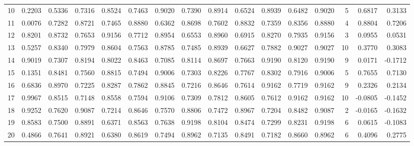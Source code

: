 \begin{tabular}{lrrrrrrrrrrrrrrr}
10  &      0.2203 &  0.5336 &  0.7316 &  0.8524 &  0.7463 &  0.9020 &  0.7390 &  0.8914 &  0.6524 &  0.8939 &   0.6482 &     0.9020 &      5 &                    0.6817 &                     0.3133 \\
11  &      0.0076 &  0.7282 &  0.8721 &  0.7465 &  0.8880 &  0.6362 &  0.8698 &  0.7602 &  0.8832 &  0.7359 &   0.8356 &     0.8880 &      4 &                    0.8804 &                     0.7206 \\
12  &      0.8201 &  0.8732 &  0.7653 &  0.9156 &  0.7712 &  0.8954 &  0.6553 &  0.8960 &  0.6915 &  0.8270 &   0.7935 &     0.9156 &      3 &                    0.0955 &                     0.0531 \\
13  &      0.5257 &  0.8340 &  0.7979 &  0.8604 &  0.7563 &  0.8785 &  0.7485 &  0.8939 &  0.6627 &  0.7882 &   0.9027 &     0.9027 &     10 &                    0.3770 &                     0.3083 \\
14  &      0.9019 &  0.7307 &  0.8194 &  0.8022 &  0.8463 &  0.7085 &  0.8114 &  0.8697 &  0.7663 &  0.9190 &   0.8120 &     0.9190 &      9 &                    0.0171 &                    -0.1712 \\
15  &      0.1351 &  0.8481 &  0.7560 &  0.8815 &  0.7494 &  0.9006 &  0.7303 &  0.8226 &  0.7767 &  0.8302 &   0.7916 &     0.9006 &      5 &                    0.7655 &                     0.7130 \\
16  &      0.6836 &  0.8970 &  0.7225 &  0.8287 &  0.7862 &  0.8845 &  0.7216 &  0.8646 &  0.7614 &  0.9162 &   0.7719 &     0.9162 &      9 &                    0.2326 &                     0.2134 \\
17  &      0.9967 &  0.8515 &  0.7148 &  0.8558 &  0.7594 &  0.9106 &  0.7309 &  0.7812 &  0.8605 &  0.7612 &   0.9162 &     0.9162 &     10 &                   -0.0805 &                    -0.1452 \\
18  &      0.9252 &  0.7620 &  0.9087 &  0.7214 &  0.8646 &  0.7570 &  0.8806 &  0.7472 &  0.8967 &  0.7204 &   0.8482 &     0.9087 &      2 &                   -0.0165 &                    -0.1632 \\
19  &      0.8583 &  0.7500 &  0.8891 &  0.6371 &  0.8563 &  0.7638 &  0.9198 &  0.8104 &  0.8474 &  0.7299 &   0.8231 &     0.9198 &      6 &                    0.0615 &                    -0.1083 \\
20  &      0.4866 &  0.7641 &  0.8921 &  0.6380 &  0.8619 &  0.7494 &  0.8962 &  0.7135 &  0.8491 &  0.7182 &   0.8660 &     0.8962 &      6 &                    0.4096 &                     0.2775 \\

\end{tabular}

